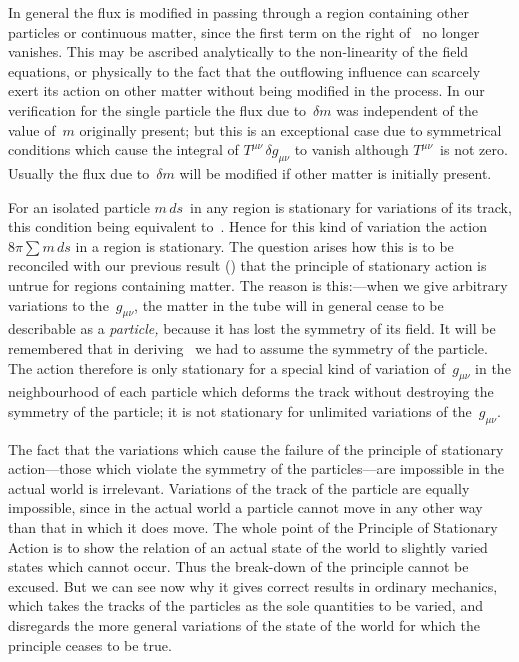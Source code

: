 \documentclass[12pt]{book}
\begin{document}
In general the flux is modified in passing through a region containing
other particles or continuous matter, since the first term on the right of~
no longer vanishes. This may be ascribed analytically to the non\hyp{}linearity of
the field equations, or physically to the fact that the outflowing influence can
scarcely exert its action on other matter without being modified in the process.
In our verification for the single particle the flux due to~$\delta m$ was independent
of the value of~$m$ originally present; but this is an exceptional case due to
symmetrical conditions which cause the integral of $T^{\mu\nu}\, \delta g_{\mu\nu}$ to vanish although
$T^{\mu\nu}$~is not zero. Usually the flux due to~$\delta m$ will be modified if other matter
is initially present.

For an isolated particle $m\, ds$~in any region is stationary for variations of
its track, this condition being equivalent to~. Hence for this kind of
variation the action $8\pi \sum m\, ds$ in a region is stationary. The question arises
how this is to be reconciled with our previous result () that the principle
of stationary action is untrue for regions containing matter. The reason is
this:---when we give arbitrary variations to the~$g_{\mu\nu}$, the matter in the tube
will in general cease to be describable as a \emph{particle,} because it has lost the
symmetry of its field\footnotemark.\footnotetext
  {It will be remembered that in deriving~ we had to assume the symmetry of the particle.}
The action therefore is only stationary for a special
kind of variation of~$g_{\mu\nu}$ in the neighbourhood of each particle which deforms
the track without destroying the symmetry of the particle; it is not stationary
for unlimited variations of the~$g_{\mu\nu}$.

The fact that the variations which cause the failure of the principle of
stationary action---those which violate the symmetry of the particles---are
impossible in the actual world is irrelevant. Variations of the track of the
particle are equally impossible, since in the actual world a particle cannot
move in any other way than that in which it does move. The whole point of
the Principle of Stationary Action is to show the relation of an actual state
of the world to slightly varied states which cannot occur. Thus the break-down
of the principle cannot be excused. But we can see now why it gives
correct results in ordinary mechanics, which takes the tracks of the particles
as the sole quantities to be varied, and disregards the more general variations
of the state of the world for which the principle ceases to be true.
\end{document}
